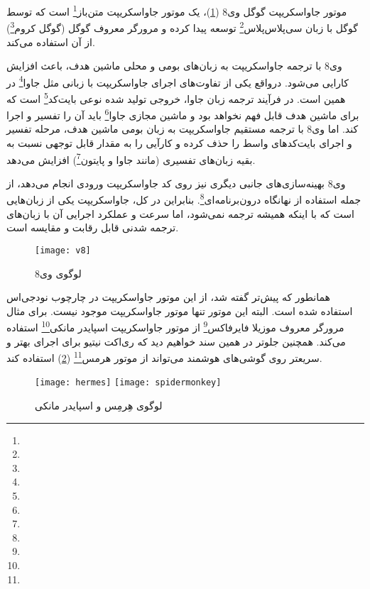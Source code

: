

موتور جاواسکریپت گوگل وی8 (\cref{fig:v8})، یک موتور جاواسکریپت متن‌باز\footnote{} است که توسط گوگل با زبان سی‌پلاس‌پلاس\footnote{} توسعه پیدا کرده و مرورگر معروف گوگل (گوگل کروم\footnote{}) از آن استفاده می‌کند\cite{wiki:v8}.

\newpage

وی8 با ترجمه جاواسکریپت به زبان‌های بومی و محلی ماشین هدف، باعث افزایش کارایی می‌شود. درواقع یکی از تفاوت‌های اجرای جاواسکریپت با زبانی مثل جاوا\footnote{} در همین است. در فرآیند ترجمه زبان جاوا، خروجی تولید شده نوعی بایت‌کد\footnote{} است که برای ماشین هدف قابل فهم نخواهد بود و ماشین مجازی جاوا\footnote{} باید آن را تفسیر و اجرا کند. اما وی8 با ترجمه مستقیم جاواسکریپت به زبان بومی ماشین هدف، مرحله تفسیر و اجرای بایت‌کدهای واسط را حذف کرده و کارآیی را به مقدار قابل توجهی نسبت به بقیه زبان‌های تفسیری (مانند جاوا و پایتون\footnote{}) افزایش می‌دهد\cite{wiki:v8}.

وی8 بهینه‌سازی‌های جانبی دیگری نیز روی کد جاواسکریپت ورودی انجام می‌دهد، از جمله استفاده از نهانگاه درون‌برنامه‌ای\footnote{}. بنابراین در کل، جاواسکریپت یکی از زبان‌هایی است که با اینکه همیشه ترجمه نمی‌شود، اما سرعت و عملکرد اجرایی آن با زبان‌های ترجمه شدنی قابل رقابت و مقایسه است\cite{wiki:v8}.

\begin{figure}[H]
	\centering
	\texttt{[image: v8]}
	\caption{لوگوی وی8}
	\label{fig:v8}
\end{figure}

همانطور که پیش‌تر گفته شد، از این موتور جاواسکریپت در چارچوب نودجی‌اس استفاده شده است. البته این موتور تنها موتور جاواسکریپت موجود نیست. برای مثال مرورگر معروف موزیلا فایرفاکس\footnote{} از موتور جاواسکریپت اسپایدر مانکی\footnote{} استفاده می‌کند. همچنین جلوتر در همین سند خواهیم دید که ری‌اکت نیتیو برای اجرای بهتر و سریعتر روی گوشی‌های هوشمند می‌تواند از موتور هرمس\footnote{} (\cref{fig:hermes}) استفاده کند\cite{v8}.

\begin{figure}[H]
	\centering
	\texttt{[image: hermes]}
	\texttt{[image: spidermonkey]}
	\caption{لوگوی هِرمِس و اسپایدر مانکی}
	\label{fig:hermes}
\end{figure}



